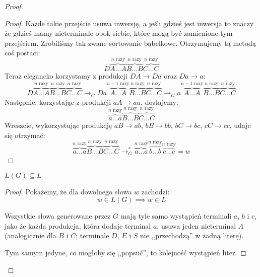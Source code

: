 \begin{proof}
\begin{proof}
        Każde takie przejście usuwa inwersję, a jeśli gdzieś jest inwersja to znaczy że gdzieś mamy nieterminale obok siebie, które mogą być zamienione tym przejściem. Zrobiliśmy tak zwane sortowanie bąbelkowe. 
        Otrzymujemy tą metodą coś postaci: 
        \[
            D \overbrace{A \dots A}^{\text{\(n\) razy}} \overbrace{B \dots B}^{\text{\(n\) razy}}
            \overbrace{C \dots C}^{\text{\(n\) razy}}
        \]
        Teraz elegancko korzystamy z produkcji \( DA \rightarrow Da \) oraz \(Da \rightarrow a\):
        \[
        D \overbrace{A \dots A}^{\text{\(n\) razy}} \overbrace{B \dots B}^{\text{\(n\) razy}}
        \overbrace{C \dots C}^{\text{\(n\) razy}} \rightarrow_G Da\overbrace{A \dots A}^{\text{\(n-1\) razy}} \overbrace{B \dots B}^{\text{\(n\) razy}}
        \overbrace{C \dots C}^{\text{\(n\) razy}}
        \rightarrow_G a\overbrace{A \dots A}^{\text{\(n-1\) razy}} \overbrace{B \dots B}^{\text{\(n\) razy}}
        \overbrace{C \dots C}^{\text{\(n\) razy}}
        \]
        Następnie, korzystając z produkcji \(aA \rightarrow aa\), dostajemy:
        \[ 
            \overbrace{a \dots a}^{\text{\(n\) razy}} \overbrace{B \dots B}^{\text{\(n\) razy}}
            \overbrace{C \dots C}^{\text{\(n\) razy}}
        \]
        Wreszcie, wykorzystując produkcję \(aB \rightarrow ab \), \(bB \rightarrow bb\), \(bC \rightarrow bc\), \( cC \rightarrow cc\), udaje się otrzymać:
        \[ 
            \overbrace{a \dots a}^{\text{\(n\) razy}} \overbrace{B \dots B}^{\text{\(n\) razy}}
            \overbrace{C \dots C}^{\text{\(n\) razy}}
            \rightarrow_G^{*}
            \overbrace{a \dots a}^{\text{\(n\) razy}} \overbrace{b \dots b}^{\text{\(n\) razy}}
            \overbrace{c \dots c}^{\text{\(n\) razy}}
            = w
        \]
    \end{proof}
    
    \begin{lemma}
        \(L(G) \subseteq L\)
    \end{lemma}
    \begin{proof}
        Pokażemy, że dla dowolnego słowa \(w\) zachodzi:
        \[ w \in L(G) \implies w \in L \] 
        
        Wszystkie słowa generowane przez \(G\) mają tyle samo wystąpień terminali \(a\), \(b\) i \(c\), jako że każda produkcja, która dodaje terminal \(a\), usuwa jeden nieterminal \(A\) (analogicznie dla \(B\) i \(C\); terminale \(D\), \(E\) i \(S\) nie ,,przechodzą'' w żadną literę). 
        
        Tym samym jedyne, co mogłoby się ,,popsuć'', to kolejność wystąpień liter.
        

\end{proof}
\end{proof}
